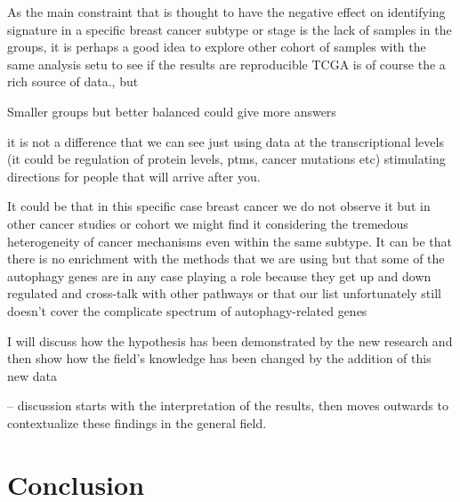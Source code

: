 As the main constraint that is thought to have the negative effect on identifying signature in a specific breast cancer subtype or stage is the lack of samples in the groups, it is perhaps a good idea to explore other cohort of samples with the same analysis setu to see if the results are reproducible  TCGA is of course the  a rich source of data., but 

Smaller groups but better balanced could give more answers 


it is not a difference that we can see just using data at the transcriptional levels (it could be regulation of protein levels, ptms, cancer mutations etc) stimulating directions for people that will arrive after you.


It could be that in this specific case breast cancer we do not observe it but in other cancer studies or cohort we might find it considering the tremedous heterogeneity of cancer mechanisms even within the same subtype. It can be that there is no enrichment with the methods that we are using but that some of the autophagy genes are in any case playing a role because they get up and down regulated  and cross-talk with other pathways or that our list unfortunately still doesn't cover the complicate spectrum of autophagy-related genes

I will discuss how the hypothesis has been demonstrated by the new research and then show how the field's knowledge has been changed by the addition of this new data

-- discussion starts with the interpretation of the results, then moves outwards to contextualize these findings in the general field.




\section{Conclusion}
